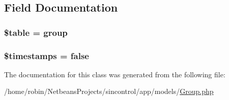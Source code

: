 \subsection{Field Documentation}
\hypertarget{class_group_ae8876a14058f368335baccf35af4a22b}{}
\subsubsection[{\$table}]{\setlength{\rightskip}{0pt plus 5cm}\$table = \textquotesingle{}group\textquotesingle{}\hspace{0.3cm}{\ttfamily [protected]}}\label{class_group_ae8876a14058f368335baccf35af4a22b}
\hypertarget{class_group_a51267c24c8fae742ed8f9be0ba6085ee}{}
\subsubsection[{\$timestamps}]{\setlength{\rightskip}{0pt plus 5cm}\$timestamps = false}\label{class_group_a51267c24c8fae742ed8f9be0ba6085ee}


The documentation for this class was generated from the following file\+:\begin{DoxyCompactItemize}
\item 
/home/robin/\+Netbeans\+Projects/sincontrol/app/models/\hyperlink{_group_8php}{Group.\+php}\end{DoxyCompactItemize}

